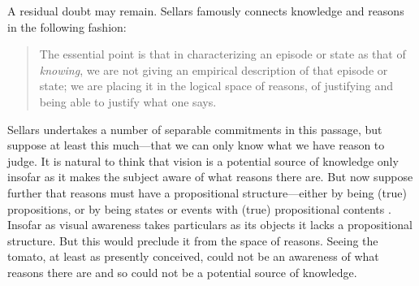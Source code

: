 \documentclass[12pt]{article}
\begin{document}
A residual doubt may remain. Sellars famously connects knowledge and reasons in the following fashion:
\begin{quote}
	The essential point is that in characterizing an episode or state as that of \emph{knowing}, we are not giving an empirical description of that episode or state; we are placing it in the logical space of reasons, of justifying and being able to justify what one says. \citep[§36]{Sellars:1956xp}
\end{quote}
Sellars undertakes a number of separable commitments in this passage, but suppose at least this much---that we can only know what we have reason to judge. It is natural to think that vision is a potential source of knowledge only insofar as it makes the subject aware of what reasons there are. But now suppose further that reasons must have a propositional structure---either by being (true) propositions, or by being states or events with (true) propositional contents \citep[see][141, 143--4]{McDowell:1996uq}. Insofar as visual awareness takes particulars as its objects it lacks a propositional structure. But this would preclude it from the space of reasons. Seeing the tomato, at least as presently conceived, could not be an awareness of what reasons there are and so could not be a potential source of knowledge.
\end{document}
